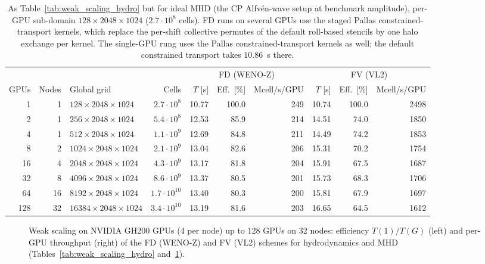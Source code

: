 \begin{table}
    \centering
    \small
    \setlength{\tabcolsep}{4pt}
    \caption{As Table~\ref{tab:weak_scaling_hydro} but for ideal MHD (the
    CP Alfv\'en-wave setup at benchmark amplitude), per-GPU sub-domain
    $128\times2048\times1024$ ($2.7\cdot10^{8}$ cells).  FD runs on
    several GPUs use the staged Pallas constrained-transport kernels, which
    replace the per-shift collective permutes of the default roll-based
    stencils by one halo exchange per kernel.  The single-GPU rung uses the Pallas
    constrained-transport kernels as well; the default constrained
    transport takes $10.86$~s there.}
    \label{tab:weak_scaling_mhd}
    \begin{tabular}{rrlrrrrrrr}
        \toprule
        & & & & \multicolumn{3}{c}{FD (WENO-Z)} & \multicolumn{3}{c}{FV (VL2)} \\
        \cmidrule(lr){5-7}\cmidrule(lr){8-10}
        GPUs & Nodes & Global grid & Cells & $T$ [s] & Eff.\ [\%] & Mcell/s/GPU & $T$ [s] & Eff.\ [\%] & Mcell/s/GPU \\
        \midrule
        1 & 1 & $128\times2048\times1024$ & $2.7\cdot10^{8}$ & 10.77 & 100.0 & 249 & 10.74 & 100.0 & 2498 \\
        2 & 1 & $256\times2048\times1024$ & $5.4\cdot10^{8}$ & 12.53 & 85.9 & 214 & 14.51 & 74.0 & 1850 \\
        4 & 1 & $512\times2048\times1024$ & $1.1\cdot10^{9}$ & 12.69 & 84.8 & 211 & 14.49 & 74.2 & 1853 \\
        8 & 2 & $1024\times2048\times1024$ & $2.1\cdot10^{9}$ & 13.04 & 82.6 & 206 & 15.31 & 70.2 & 1754 \\
        16 & 4 & $2048\times2048\times1024$ & $4.3\cdot10^{9}$ & 13.17 & 81.8 & 204 & 15.91 & 67.5 & 1687 \\
        32 & 8 & $4096\times2048\times1024$ & $8.6\cdot10^{9}$ & 13.37 & 80.5 & 201 & 15.73 & 68.3 & 1706 \\
        64 & 16 & $8192\times2048\times1024$ & $1.7\cdot10^{10}$ & 13.40 & 80.3 & 200 & 15.81 & 67.9 & 1697 \\
        128 & 32 & $16384\times2048\times1024$ & $3.4\cdot10^{10}$ & 13.19 & 81.6 & 203 & 16.65 & 64.5 & 1612 \\
        \bottomrule
    \end{tabular}
\end{table}

\begin{figure}
    \centering
    
    \caption{Weak scaling on NVIDIA GH200 GPUs (4 per node) up to 128 GPUs
    on 32 nodes: efficiency $T(1)/T(G)$ (left) and per-GPU throughput
    (right) of the FD (WENO-Z) and FV (VL2) schemes for hydrodynamics and
    MHD (Tables~\ref{tab:weak_scaling_hydro} and~\ref{tab:weak_scaling_mhd}).}
    \label{fig:weak_scaling}
\end{figure}

